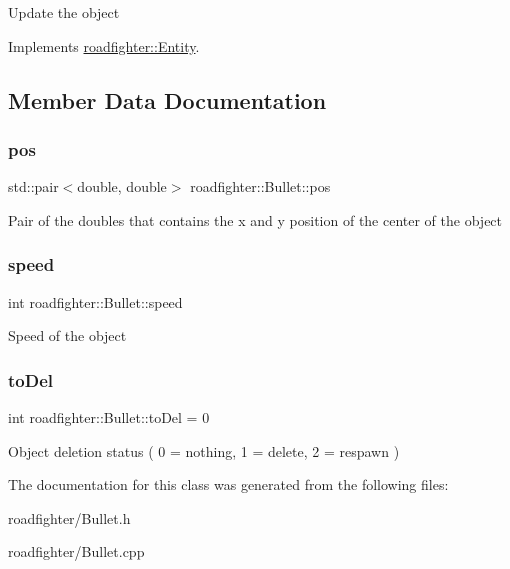 Update the object 

Implements \hyperlink{classroadfighter_1_1Entity_a19cd353f12a3e8432acd6d5609137561}{roadfighter\+::\+Entity}.



\subsection{Member Data Documentation}
\mbox{\label{classroadfighter_1_1Bullet_a55d144151e85951e815d396a45701c8e}} 
\subsubsection{\texorpdfstring{pos}{pos}}
{\footnotesize\ttfamily std\+::pair$<$double, double$>$ roadfighter\+::\+Bullet\+::pos\hspace{0.3cm}{\ttfamily [protected]}}

Pair of the doubles that contains the x and y position of the center of the object \mbox{\label{classroadfighter_1_1Bullet_a88e3752878d08ceeaaaf307158f20d41}} 
\subsubsection{\texorpdfstring{speed}{speed}}
{\footnotesize\ttfamily int roadfighter\+::\+Bullet\+::speed\hspace{0.3cm}{\ttfamily [protected]}}

Speed of the object \mbox{\label{classroadfighter_1_1Bullet_a400c93d89107eed04fff90f22dd37247}} 
\subsubsection{\texorpdfstring{to\+Del}{toDel}}
{\footnotesize\ttfamily int roadfighter\+::\+Bullet\+::to\+Del = 0\hspace{0.3cm}{\ttfamily [protected]}}

Object deletion status ( 0 = nothing, 1 = delete, 2 = respawn ) 

The documentation for this class was generated from the following files\+:\begin{DoxyCompactItemize}
\item 
roadfighter/Bullet.\+h\item 
roadfighter/Bullet.\+cpp\end{DoxyCompactItemize}
